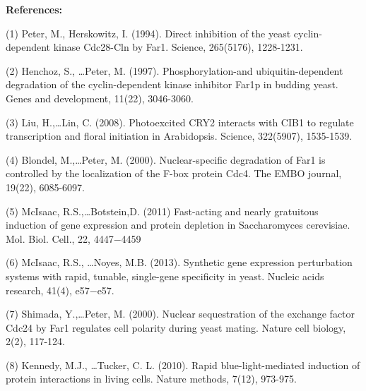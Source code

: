 \documentclass[12pt]{article}
\begin{document}
\small
\textbf{References:}

(1) Peter, M., Herskowitz, I. (1994). Direct inhibition of the yeast cyclin-dependent kinase Cdc28-Cln by Far1. Science, 265(5176), 1228-1231.

(2) Henchoz, S., \ldots Peter, M. (1997). Phosphorylation-and ubiquitin-dependent degradation of the cyclin-dependent kinase inhibitor Far1p in budding yeast. Genes and development, 11(22), 3046-3060. %

(3) Liu, H.,\ldots Lin, C. (2008). Photoexcited CRY2 interacts with CIB1 to regulate transcription and floral initiation in Arabidopsis. Science, 322(5907), 1535-1539. %

(4) Blondel, M.,\ldots Peter, M. (2000). Nuclear-specific degradation of Far1 is controlled by the localization of the F-box protein Cdc4. The EMBO journal, 19(22), 6085-6097. %

(5) McIsaac, R.S.,\ldots Botstein,D. (2011) Fast-acting and nearly gratuitous induction of gene expression and protein depletion in Saccharomyces cerevisiae. Mol. Biol.  Cell., 22, 4447$-$4459 %

(6) McIsaac, R.S., \ldots Noyes, M.B. (2013). Synthetic gene expression perturbation systems with rapid, tunable, single-gene specificity in yeast. Nucleic acids research, 41(4), e57$-$e57.

(7) Shimada, Y.,\ldots Peter, M. (2000). Nuclear sequestration of the exchange factor Cdc24 by Far1 regulates cell polarity during yeast mating. Nature cell biology, 2(2), 117-124.

(8) Kennedy, M.J., \ldots Tucker, C. L. (2010). Rapid blue-light-mediated induction of protein interactions in living cells. Nature methods, 7(12), 973-975.
\end{document}
